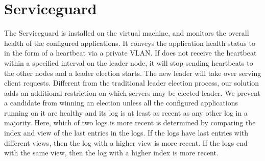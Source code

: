 \section{Serviceguard} \label{sec:guard}

The Serviceguard is installed on the virtual machine, and monitors the overall health of 
the configured applications. It conveys the application health status to \smrsystem in the 
form of a heartbeat via a private VLAN. If \smrsystem does not receive the heartbeat within 
a specified interval on the leader node, it will stop sending heartbeats to the other nodes  
and a leader election starts. The new leader will take over serving client requests. Different 
from the traditional \paxos leader election process, our solution adds an additional restriction 
on which servers may be elected leader. We prevent a candidate from winning an election unless 
all the configured applications running on it are healthy and its log is at least as recent as
any other log in a majority. Here, which of two logs is more recent is determined by comparing 
the index and view of the last entries in the logs. If the logs have last entries with different 
views, then the log with a higher view is more recent. If the logs end with the same view, then 
the log with a higher index is more recent. 
